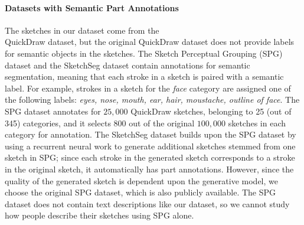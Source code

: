 \paragraph{Datasets with Semantic Part Annotations}
The sketches in our dataset come from the \\
QuickDraw dataset, but the original QuickDraw dataset does not provide labels for semantic objects in the sketches. 
The Sketch Perceptual Grouping (SPG) dataset \citep{spg_paper} and the SketchSeg dataset \citep{sketchsegDataset} contain annotations for semantic segmentation, meaning that each stroke in a sketch is paired with a semantic label. For example, strokes in a sketch for the \textit{face} category are assigned one of the following labels: \textit{eyes, nose, mouth, ear, hair, moustache, outline of face}. 
The SPG dataset annotates for $25,000$ QuickDraw sketches, belonging to 25 (out of 345) categories, and it selects 800 out of the original $100,000$ sketches in each category for annotation. 
The SketchSeg dataset builds upon the SPG dataset by using a recurrent neural work to generate additional sketches stemmed from one sketch in SPG; since each stroke in the generated sketch corresponds to a stroke in the original sketch, it automatically has part annotations. However, since the quality of the generated sketch is dependent upon the generative model, we choose the original SPG dataset, which is also publicly available. 
The SPG dataset does not contain text descriptions like our dataset, so we cannot study how people describe their sketches using SPG alone. 

